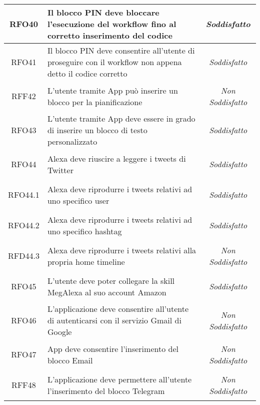 \begin{longtable}{|c|>{\centering}m{7cm}|c|}
	\hypertarget{RFO40}{RFO40} & Il blocco PIN deve bloccare l'esecuzione del workflow fino al corretto inserimento del codice & \textit{Soddisfatto}\\ \hline
	
	\hypertarget{RFO41}{RFO41} & Il blocco PIN deve consentire all'utente di proseguire con il workflow non appena detto il codice corretto & \textit{Soddisfatto}\\ \hline
	
	\hypertarget{RFF42}{RFF42} & L'utente tramite App può inserire un blocco per la pianificazione & \textit{Non Soddisfatto}\\ \hline
	
	\hypertarget{RFO43}{RFO43} & L'utente tramite App deve essere in grado di inserire un blocco di testo personalizzato & \textit{Soddisfatto}\\ \hline
	
	\hypertarget{RFO44}{RFO44} & Alexa deve riuscire a leggere i tweets di Twitter & \textit{Soddisfatto}\\ \hline
	
	\hypertarget{RFO44.1}{RFO44.1} & Alexa deve riprodurre i tweets relativi ad uno specifico user & \textit{Soddisfatto}\\ \hline
	
	\hypertarget{RFO44.2}{RFO44.2} & Alexa deve riprodurre i tweets relativi ad uno specifico hashtag & \textit{Soddisfatto}\\ \hline
	
	\hypertarget{RFD44.3}{RFD44.3} & Alexa deve riprodurre i tweets relativi alla propria home timeline & \textit{Non Soddisfatto}\\ \hline
	
	\hypertarget{RFO45}{RFO45} & L'utente deve poter collegare la skill MegAlexa al suo account Amazon & \textit{Soddisfatto}\\ \hline
	
	\hypertarget{RFO46}{RFO46} & L'applicazione deve consentire all'utente di autenticarsi con il servizio Gmail di Google & \textit{Non Soddisfatto}\\ \hline
	
	\hypertarget{RFO47}{RFO47} & App deve consentire l'inserimento del blocco Email & \textit{Non Soddisfatto}\\ \hline
	
	\hypertarget{RFF48}{RFF48} & L'applicazione deve permettere all'utente l'inserimento del blocco Telegram & \textit{Non Soddisfatto}\\ \hline
	

\end{longtable}
